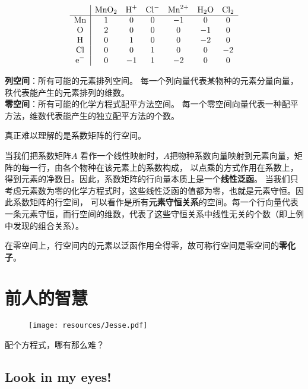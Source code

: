 \documentclass{ctexart}
\begin{document}
\noindent
\begin{minipage}[c]{0.5\textwidth}
    \[
        \begin{array}{c|*{5}{c}c}
            & \ce{MnO2} & \ce{H+} &\ce{Cl-} &\ce{Mn^2+} &\ce{H2O} &\ce{Cl2} \\
            \hline
            \ce{Mn} & 1 & 0 & 0 & -1 & 0 & 0\\
            \ce{O} & 2 & 0 & 0 & 0 & -1 & 0\\
            \ce{H} & 0 & 1 & 0 & 0 & -2 & 0\\
            \ce{Cl} & 0 & 0 & 1 & 0 & 0 & -2\\
            \ce{e^-} & 0 & -1 & 1 & -2 & 0 & 0\\
        \end{array}
    \]
\end{minipage}%
\hfill
\begin{minipage}[c]{0.45\textwidth}
    \textbf{列空间}：所有可能的元素排列空间。
    每一个列向量代表某物种的元素分量向量，秩代表能产生的元素排列的维数。
    \\[1em]
    \textbf{零空间}：所有可能的化学方程式配平方法空间。
    每一个零空间向量代表一种配平方法，维数代表能产生的独立配平方法的个数。
\end{minipage}
\vspace{1em}

真正难以理解的是系数矩阵的行空间。

当我们把系数矩阵\(A\) 看作一个线性映射时，\(A\)把物种系数向量映射到元素向量，矩阵的每一行，由各个物种在该元素上的系数构成，
以点乘的方式作用在系数上，得到元素的净数目。因此，系数矩阵的行向量本质上是一个\textbf{线性泛函}。
当我们只考虑元素数为零的化学方程式时，这些线性泛函的值都为零，也就是元素守恒。因此系数矩阵的行空间，
可以看作是所有\textbf{元素守恒关系}的空间。每一个行向量代表一条元素守恒，而行空间的维数，代表了这些守恒关系中线性无关的个数（即上例中发现的组合关系）。

在零空间上，行空间内的元素以泛函作用全得零，故可称行空间是零空间的\textbf{零化子}。

\section{前人的智慧}

\begin{figure}[H]
    \centering
    \texttt{[image: resources/Jesse.pdf]}
\end{figure}
配个方程式，哪有那么难？
\subsection{Look in my eyes!}

\printbibliography[heading=bibintoc,title={参考文献}]
\end{document}
